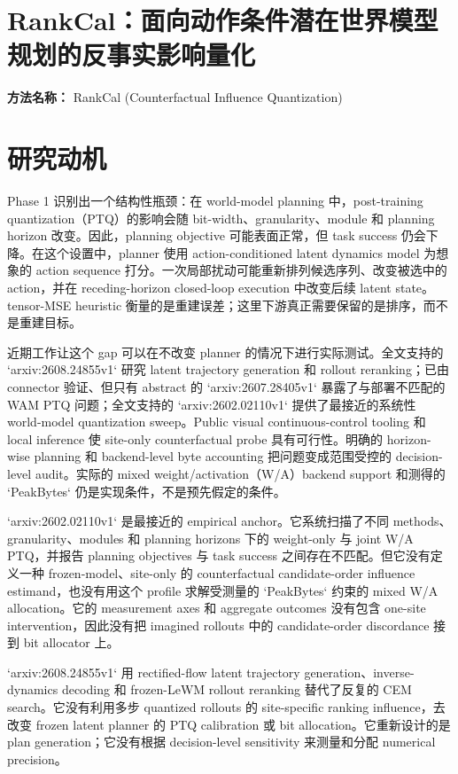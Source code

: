 \documentclass[10pt,a4paper]{article}
\begin{document}
\section*{RankCal：面向动作条件潜在世界模型规划的反事实影响量化}
\textbf{方法名称：} RankCal (Counterfactual Influence Quantization)
\section*{研究动机}
Phase 1 识别出一个结构性瓶颈：在 world-model planning 中，post-training quantization（PTQ）的影响会随 bit-width、granularity、module 和 planning horizon 改变。因此，planning objective 可能表面正常，但 task success 仍会下降。在这个设置中，planner 使用 action-conditioned latent dynamics model 为想象的 action sequence 打分。一次局部扰动可能重新排列候选序列、改变被选中的 action，并在 receding-horizon closed-loop execution 中改变后续 latent state。tensor-MSE heuristic 衡量的是重建误差；这里下游真正需要保留的是排序，而不是重建目标。

近期工作让这个 gap 可以在不改变 planner 的情况下进行实际测试。全文支持的 `arxiv:2608.24855v1` 研究 latent trajectory generation 和 rollout reranking；已由 connector 验证、但只有 abstract 的 `arxiv:2607.28405v1` 暴露了与部署不匹配的 WAM PTQ 问题；全文支持的 `arxiv:2602.02110v1` 提供了最接近的系统性 world-model quantization sweep。Public visual continuous-control tooling 和 local inference 使 site-only counterfactual probe 具有可行性。明确的 horizon-wise planning 和 backend-level byte accounting 把问题变成范围受控的 decision-level audit。实际的 mixed weight/activation（W/A）backend support 和测得的 `PeakBytes` 仍是实现条件，不是预先假定的条件。

`arxiv:2602.02110v1` 是最接近的 empirical anchor。它系统扫描了不同 methods、granularity、modules 和 planning horizons 下的 weight-only 与 joint W/A PTQ，并报告 planning objectives 与 task success 之间存在不匹配。但它没有定义一种 frozen-model、site-only 的 counterfactual candidate-order influence estimand，也没有用这个 profile 求解受测量的 `PeakBytes` 约束的 mixed W/A allocation。它的 measurement axes 和 aggregate outcomes 没有包含 one-site intervention，因此没有把 imagined rollouts 中的 candidate-order discordance 接到 bit allocator 上。

`arxiv:2608.24855v1` 用 rectified-flow latent trajectory generation、inverse-dynamics decoding 和 frozen-LeWM rollout reranking 替代了反复的 CEM search。它没有利用多步 quantized rollouts 的 site-specific ranking influence，去改变 frozen latent planner 的 PTQ calibration 或 bit allocation。它重新设计的是 plan generation；它没有根据 decision-level sensitivity 来测量和分配 numerical precision。
\end{document}
